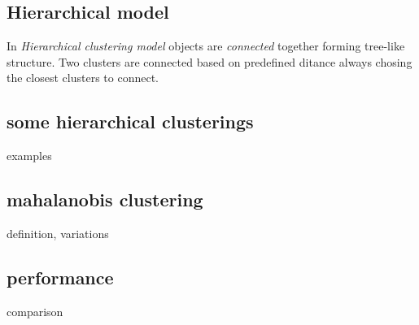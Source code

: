 \subsection{Hierarchical model}
In \emph{Hierarchical clustering model} objects are \emph{connected} together forming tree-like structure. Two clusters are connected based on predefined ditance always chosing the closest clusters to connect. 

\subsection{some hierarchical clusterings}

examples

\subsection{mahalanobis clustering}

definition, variations

\subsection{performance}

comparison